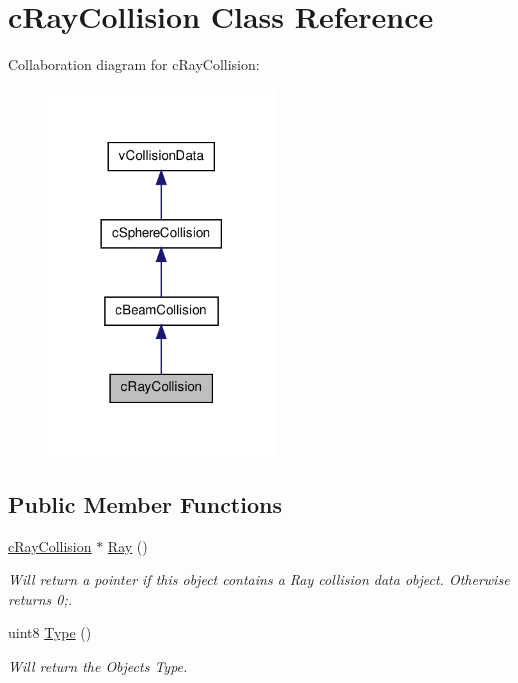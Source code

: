 \hypertarget{classc_ray_collision}{
\section{cRayCollision Class Reference}
\label{classc_ray_collision}
}


Collaboration diagram for cRayCollision:\nopagebreak
\begin{figure}[H]
\begin{center}
\leavevmode
\includegraphics[width=170pt]{classc_ray_collision__coll__graph}
\end{center}
\end{figure}
\subsection*{Public Member Functions}
\begin{DoxyCompactItemize}
\item 
\hypertarget{classc_ray_collision_a15c115d29c701b9e6e02ce5da6d12735}{
\hyperlink{classc_ray_collision}{cRayCollision} $\ast$ \hyperlink{classc_ray_collision_a15c115d29c701b9e6e02ce5da6d12735}{Ray} ()}
\label{classc_ray_collision_a15c115d29c701b9e6e02ce5da6d12735}

\begin{DoxyCompactList}\small\item\em Will return a pointer if this object contains a Ray collision data object. Otherwise returns 0;. \end{DoxyCompactList}\item 
\hypertarget{classc_ray_collision_a1f52b727d99d7abcc21196a65f8f4a25}{
uint8 \hyperlink{classc_ray_collision_a1f52b727d99d7abcc21196a65f8f4a25}{Type} ()}
\label{classc_ray_collision_a1f52b727d99d7abcc21196a65f8f4a25}

\begin{DoxyCompactList}\small\item\em Will return the Objects Type. \end{DoxyCompactList}\end{DoxyCompactItemize}


